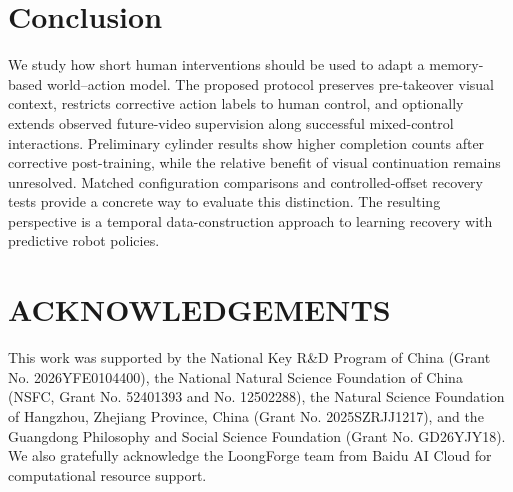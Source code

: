 \documentclass[letterpaper,10pt,conference]{ieeeconf}
\begin{document}
\section{Conclusion}
We study how short human interventions should be used to adapt a memory-based world--action model. The proposed protocol preserves pre-takeover visual context, restricts corrective action labels to human control, and optionally extends observed future-video supervision along successful mixed-control interactions. Preliminary cylinder results show higher completion counts after corrective post-training, while the relative benefit of visual continuation remains unresolved. Matched configuration comparisons and controlled-offset recovery tests provide a concrete way to evaluate this distinction. The resulting perspective is a temporal data-construction approach to learning recovery with predictive robot policies.

\section*{ACKNOWLEDGEMENTS}
This work was supported by the National Key R\&D Program of China (Grant No. 2026YFE0104400), the National Natural Science Foundation of China (NSFC, Grant No. 52401393 and No. 12502288), the Natural Science Foundation of Hangzhou, Zhejiang Province, China (Grant No. 2025SZRJJ1217), and the Guangdong Philosophy and Social Science Foundation (Grant No. GD26YJY18). We also gratefully acknowledge the LoongForge team from Baidu AI Cloud for computational resource support.



\end{document}
